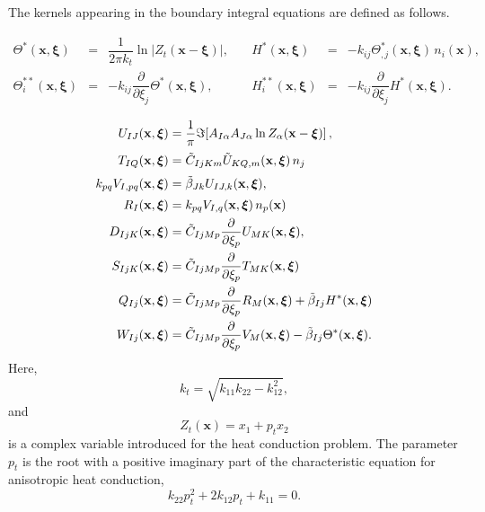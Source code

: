 	
	The kernels appearing in the boundary integral equations are defined as follows.
	
	\begin{equation}
		\begin{array}{rclrcl}
			\Theta^{*}(\mathbf{x},\boldsymbol{\xi}) 
			&=& \dfrac{1}{2\pi k_t}
			\ln\left|Z_t(\mathbf{x}-\boldsymbol{\xi})\right|,
			\quad &
			H^{*}(\mathbf{x},\boldsymbol{\xi})
			&=& -k_{ij}\Theta^{*}_{,j}(\mathbf{x},\boldsymbol{\xi})\,n_i(\mathbf{x}),
			\\[1em]
			\Theta_i^{**}(\mathbf{x},\boldsymbol{\xi})
			&=& -k_{ij}\dfrac{\partial}{\partial \xi_j}
			\Theta^{*}(\mathbf{x},\boldsymbol{\xi}),
			\quad &
			H_i^{**}(\mathbf{x},\boldsymbol{\xi})
			&=& -k_{ij}\dfrac{\partial}{\partial \xi_j}
			H^{*}(\mathbf{x},\boldsymbol{\xi}).
		\end{array}
		\label{KushnirEq11}
	\end{equation}
	
	\begin{align}
		\notag
		U_{IJ}(\mathbf{x},\boldsymbol{\xi})
		&=
		\frac{1}{\pi}
		\Im\!\left[
		A_{I\alpha}A_{J\alpha}
		\ln Z_\alpha(\mathbf{x}-\boldsymbol{\xi})
		\right],
		\\[.2em]
		\notag
		T_{IQ}(\mathbf{x},\boldsymbol{\xi})
		&=
		\tilde{C}_{IjKm}\tilde{U}_{KQ,m}(\mathbf{x},\boldsymbol{\xi})\,n_j
		\\[.2em]
		\notag
		k_{pq}V_{I,pq}(\mathbf{x},\boldsymbol{\xi})
		&=
		\tilde{\beta}_{Jk}U_{IJ,k}(\mathbf{x},\boldsymbol{\xi}),
		\\[.2em]
		\notag
		R_I(\mathbf{x},\boldsymbol{\xi})
		&=
		k_{pq}V_{I,q}(\mathbf{x},\boldsymbol{\xi})\,n_p(\mathbf{x})
		\\
		\label{KushnirEq12}
		D_{IjK}(\mathbf{x},\boldsymbol{\xi})
		&=
		\tilde{C}_{IjMp}
		\frac{\partial}{\partial\xi_p}
		U_{MK}(\mathbf{x},\boldsymbol{\xi}),
		\\
		\notag
		S_{IjK}(\mathbf{x},\boldsymbol{\xi})
		&=
		\tilde{C}_{IjMp}
		\frac{\partial}{\partial\xi_p}
		T_{MK}(\mathbf{x},\boldsymbol{\xi})
			\\
			\notag
		Q_{Ij}(\mathbf{x},\boldsymbol{\xi})
		&=
		\tilde{C}_{IjMp}
		\frac{\partial}{\partial\xi_p}
		R_M(\mathbf{x},\boldsymbol{\xi})
		+
		\tilde{\beta}_{Ij}
		H^{*}(\mathbf{x},\boldsymbol{\xi})
		\\
		\notag
		W_{Ij}(\mathbf{x},\boldsymbol{\xi})
		&=
		\tilde{C}_{IjMp}
		\frac{\partial}{\partial\xi_p}
		V_M(\mathbf{x},\boldsymbol{\xi})
		-
		\tilde{\beta}_{Ij}
		\Theta^{*}(\mathbf{x},\boldsymbol{\xi}).
	\end{align}
	Here,
	\[
	k_t=\sqrt{k_{11}k_{22}-k_{12}^{2}},
	\]
	and
	\[
	Z_t(\mathbf{x}) = x_1 + p_t x_2
	\]
	is a complex variable introduced for the heat conduction problem.
	The parameter $p_t$ is the root with a positive imaginary part of
	the characteristic equation for anisotropic heat conduction,
	\[
	k_{22}p_t^2 + 2k_{12}p_t + k_{11} = 0 .
	\]
	
